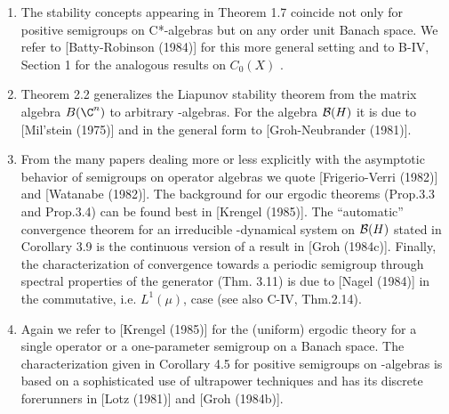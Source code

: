 \begin{enumerate}[label=\emph{Section \arabic*:}, wide]
\item
The stability concepts appearing in Theorem 1.7 coincide not only for positive semigroups on C*-algebras but on any order unit Banach space.
We refer to [Batty-Robinson (1984)] for this more general setting and to B-IV, Section 1 for the analogous results on $ C_{0}(X) $ .

\item
Theorem 2.2 generalizes the Liapunov stability theorem from the matrix algebra $ B(\C^{n}) $  to arbitrary \WA-algebras.
For the algebra $ \mathcal{B}(H) $  it is due to [Mil'stein (1975)] and in the general form to [Groh-Neubrander (1981)].

\item
From the many papers dealing more or less explicitly with the asymptotic behavior of semigroups on operator algebras we quote [Frigerio-Verri (1982)] and [Watanabe (1982)].
The background for our ergodic theorems (Prop.3.3 and Prop.3.4) can be found best in [Krengel (1985)].
The \enquote{automatic} convergence theorem for an irreducible \WA-dynamical system on $ \mathcal{B}(H) $  stated in Corollary 3.9 is the continuous version of a result in [Groh (1984c)].
Finally, the characterization of convergence towards a periodic semigroup through spectral properties of the generator (Thm. 3.11) is due to [Nagel (1984)] in the commutative, i.e. $ L^{1}(\mu) $, case (see also C-IV, Thm.2.14).

\item
Again we refer to [Krengel (1985)] for the (uniform) ergodic theory for a single operator or a one-parameter semigroup on a Banach space.
The characterization given in Corollary 4.5 for positive semigroups on \WA-algebras is based on a sophisticated use of ultrapower techniques and has its discrete forerunners in [Lotz (1981)] and [Groh (1984b)].
\end{enumerate}

